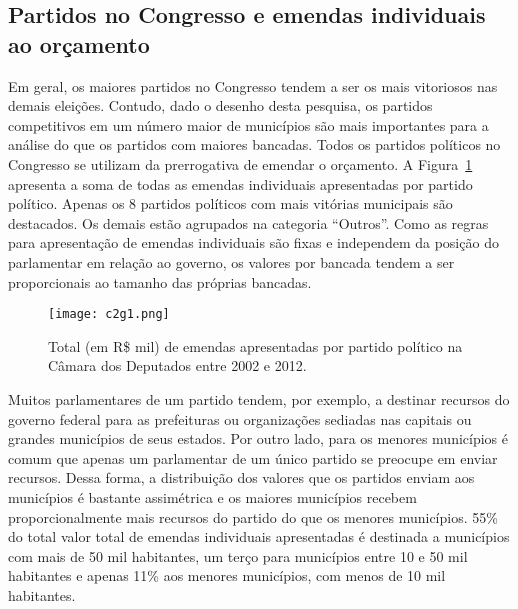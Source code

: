 \subsection{Partidos no Congresso e emendas individuais ao orçamento}

Em geral, os maiores partidos no Congresso tendem a ser os mais vitoriosos nas demais eleições. Contudo, dado o desenho desta pesquisa, os partidos competitivos em um número maior de municípios são mais importantes para a análise do que os partidos com maiores bancadas. Todos os partidos políticos no Congresso se utilizam da prerrogativa de emendar o orçamento. A Figura~\ref{fig:c2g1} apresenta a soma de todas as emendas individuais apresentadas por partido político. Apenas os 8 partidos políticos com mais vitórias municipais são destacados. 
Os demais estão agrupados na categoria ``Outros''. Como as regras para apresentação de emendas individuais são fixas e independem da posição do parlamentar em relação ao governo, os valores por bancada tendem a ser proporcionais ao tamanho das próprias bancadas.

\begin{figure}[htp]
	\centering
	\texttt{[image: c2g1.png]}
	\caption{Total (em R\$ mil) de emendas apresentadas por partido político na Câmara dos Deputados entre 2002 e 2012.}
	\label{fig:c2g1}
\end{figure}

Muitos parlamentares de um partido tendem, por exemplo, a destinar recursos do governo federal para as prefeituras ou organizações sediadas nas capitais ou grandes municípios de seus estados. Por outro lado, para os menores municípios é comum que apenas um parlamentar de um único partido se preocupe em enviar recursos. Dessa forma, a distribuição dos valores que os partidos enviam aos municípios é bastante assimétrica e os maiores municípios recebem proporcionalmente mais recursos do partido do que os menores municípios. 55\% do total valor total de emendas individuais apresentadas é destinada a municípios com mais de 50 mil habitantes, um terço para municípios entre 10 e 50 mil habitantes e apenas 11\% aos menores municípios, com menos de 10 mil habitantes.

